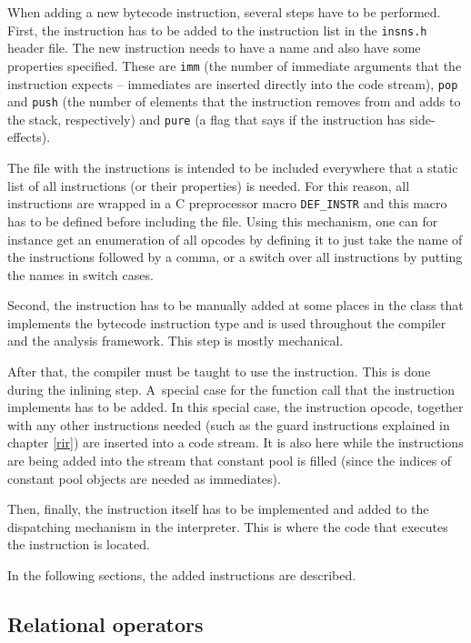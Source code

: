 When adding a new bytecode instruction, several steps have to be performed. First, the instruction has to be added to the instruction list in the \verb/insns.h/ header file. The new instruction needs to have a name and also have some properties specified. These are \verb/imm/ (the number of immediate arguments that the instruction expects -- immediates are inserted directly into the code stream), \verb/pop/ and \verb/push/ (the number of elements that the instruction removes from and adds to the stack, respectively) and \verb/pure/ (a flag that says if the instruction has side-effects).

The file with the instructions is intended to be included everywhere that a static list of all instructions (or their properties) is needed. For this reason, all instructions are wrapped in a C preprocessor macro \verb/DEF_INSTR/ and this macro has to be defined before including the file. Using this mechanism, one can for instance get an enumeration of all opcodes by defining it to just take the name of the instructions followed by a comma, or a switch over all instructions by putting the names in switch cases.

Second, the instruction has to be manually added at some places in the class that implements the bytecode instruction type and is used throughout the compiler and the analysis framework. This step is mostly mechanical.

After that, the compiler must be taught to use the instruction. This is done during the inlining step. A~special case for the function call that the instruction implements has to be added. In this special case, the instruction opcode, together with any other instructions needed (such as the guard instructions explained in chapter \ref{rir}) are inserted into a code stream. It is also here while the instructions are being added into the stream that constant pool is filled (since the indices of constant pool objects are needed as immediates).

Then, finally, the instruction itself has to be implemented and added to the dispatching mechanism in the interpreter. This is where the code that executes the instruction is located.

In the following sections, the added instructions are described.


\subsection{Relational operators}

